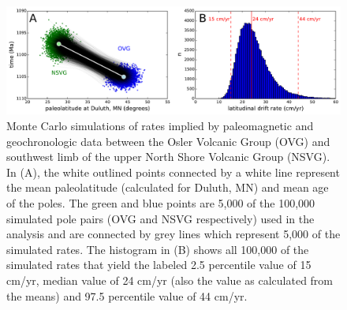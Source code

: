 \documentclass[draft,gc]{AGUTeX}
\begin{document}
\begin{figure}
\noindent\includegraphics[width=\textwidth]{2014_Osler_Figures/MonteCarlo.pdf}
\caption{Monte Carlo simulations of rates implied by paleomagnetic and geochronologic data between the Osler Volcanic Group (OVG) and southwest limb of the upper North Shore Volcanic Group (NSVG). In (A), the white outlined points connected by a white line represent the mean paleolatitude (calculated for Duluth, MN) and mean age of the poles. The green and blue points are 5,000 of the 100,000 simulated pole pairs (OVG and NSVG respectively) used in the analysis and are connected by grey lines which represent 5,000 of the simulated rates. The histogram in (B) shows all 100,000 of the simulated rates that yield the labeled 2.5 percentile value of 15 cm/yr, median value of 24 cm/yr (also the value as calculated from the means) and 97.5 percentile value of 44 cm/yr.}
\label{fig:MonteCarlo}
\end{figure}
\end{document}
